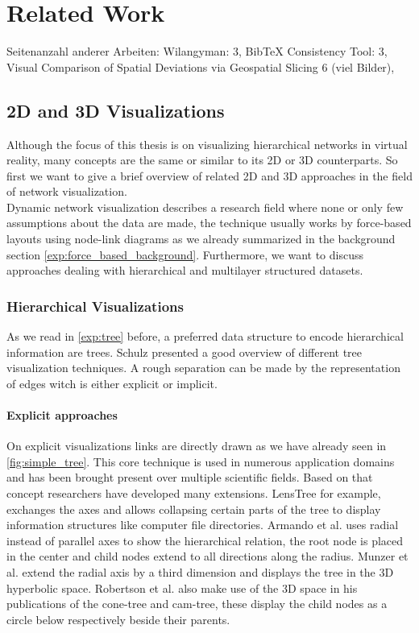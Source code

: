 \chapter{Related Work}
Seitenanzahl anderer Arbeiten: Wilangyman: 3, BibTeX Consistency Tool: 3, Visual Comparison of Spatial Deviations via Geospatial Slicing 6 (viel Bilder), 

\section{2D and 3D Visualizations}

Although the focus of this thesis is on visualizing hierarchical networks in virtual reality, many concepts are the same or similar to its 2D or 3D counterparts. So first we want to give a brief overview of related 2D and 3D approaches in the field of network visualization.\\
Dynamic network visualization describes a research field where none or only few assumptions about the data are made, the technique usually works by force-based layouts using node-link diagrams as we already summarized in the background section \ref{exp:force_based_background}. Furthermore, we want to discuss approaches dealing with hierarchical and multilayer structured datasets.

\subsection{Hierarchical Visualizations}

As we read in \ref{exp:tree} before, a preferred data structure to encode hierarchical information are trees.
Schulz \cite{schulz_treevisnet_2011} presented a good overview of different tree visualization techniques. A rough separation can be made by the representation of edges witch is either explicit or implicit. 

\subsubsection{Explicit approaches}
On explicit visualizations links are directly drawn as we have already seen in \ref{fig:simple_tree}. This core technique is used in numerous application domains and has been brought present over multiple scientific fields. Based on that concept researchers have developed many extensions.
LensTree \cite{song_lenstree_2006} for example, exchanges the axes and allows collapsing certain parts of the tree to display information structures like computer file directories. 
Armando et al. \cite{arce-orozco_radial_2017} uses radial instead of parallel axes to show the hierarchical relation, the root node is placed in the center and child nodes extend to all directions along the radius.
Munzer et al. \cite{munzner_h3_1997} extend the radial axis by a third dimension and displays the tree in the 3D hyperbolic space.
Robertson et al. \cite{robertson_cone_1991} also make use of the 3D space in his publications of the cone-tree and cam-tree, these display the child nodes as a circle below respectively beside their parents.  

